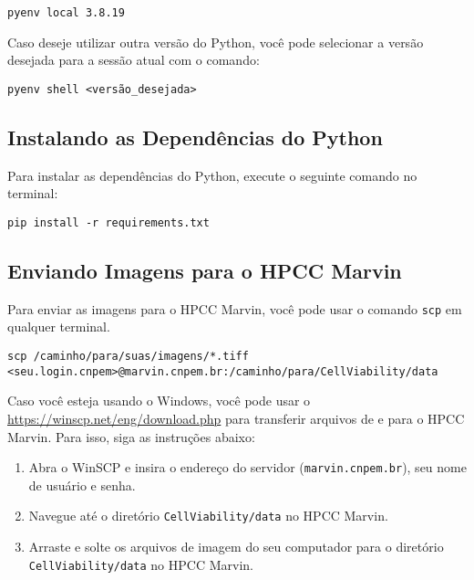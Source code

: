 \documentclass{article}
\begin{document}
\begin{verbatim}
pyenv local 3.8.19
\end{verbatim}

Caso deseje utilizar outra versão do Python, você pode selecionar a versão desejada para a sessão atual com o comando:

\begin{verbatim}
pyenv shell <versão_desejada>
\end{verbatim}

\subsection{Instalando as Dependências do Python}

Para instalar as dependências do Python, execute o seguinte comando no terminal:

\begin{verbatim}
pip install -r requirements.txt
\end{verbatim}

\subsection{Enviando Imagens para o HPCC Marvin}

Para enviar as imagens para o HPCC Marvin, você pode usar o comando \texttt{scp} em qualquer terminal.

\begin{verbatim}
scp /caminho/para/suas/imagens/*.tiff <seu.login.cnpem>@marvin.cnpem.br:/caminho/para/CellViability/data
\end{verbatim}

Caso você esteja usando o Windows, você pode usar o \href{WinSCP}{https://winscp.net/eng/download.php} para transferir arquivos de e para o HPCC Marvin. Para isso, siga as instruções abaixo:

\begin{enumerate}
  \item Abra o WinSCP e insira o endereço do servidor (\texttt{marvin.cnpem.br}), seu nome de usuário e senha.
  \item Navegue até o diretório \texttt{CellViability/data} no HPCC Marvin.
  \item Arraste e solte os arquivos de imagem do seu computador para o diretório \texttt{CellViability/data} no HPCC Marvin.
\end{enumerate}
\end{document}
